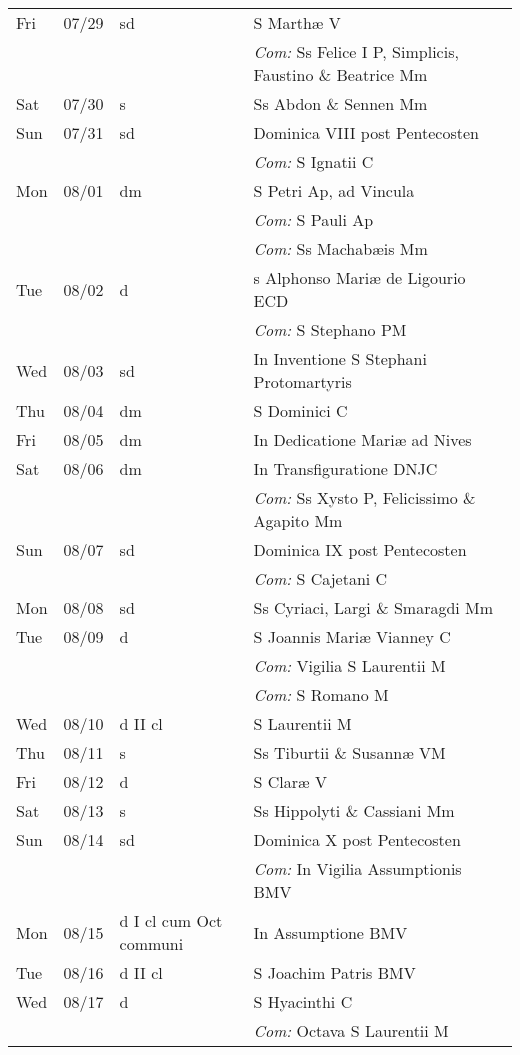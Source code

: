 \documentclass[10pt]{article}
\begin{document}
\begin{longtable}{ l l l l }
Fri & 07/29 & sd & S Marthæ V\\
 & & & \textit{Com:} Ss Felice I P, Simplicis, Faustino \& Beatrice Mm\\
Sat & 07/30 & s & Ss Abdon \& Sennen Mm\\
Sun & 07/31 & sd & Dominica VIII post Pentecosten\\
 & & & \textit{Com:} S Ignatii C\\
Mon & 08/01 & dm & S Petri Ap, ad Vincula\\
 & & & \textit{Com:} S Pauli Ap\\
 & & & \textit{Com:} Ss Machabæis Mm\\
Tue & 08/02 & d & s Alphonso Mariæ de Ligourio ECD\\
 & & & \textit{Com:} S Stephano PM\\
Wed & 08/03 & sd & In Inventione S Stephani Protomartyris\\
Thu & 08/04 & dm & S Dominici C\\
Fri & 08/05 & dm & In Dedicatione Mariæ ad Nives\\
Sat & 08/06 & dm & In Transfiguratione DNJC\\
 & & & \textit{Com:} Ss Xysto P, Felicissimo \& Agapito Mm\\
Sun & 08/07 & sd & Dominica IX post Pentecosten\\
 & & & \textit{Com:} S Cajetani C\\
Mon & 08/08 & sd & Ss Cyriaci, Largi \& Smaragdi Mm\\
Tue & 08/09 & d & S Joannis Mariæ Vianney C\\
 & & & \textit{Com:} Vigilia S Laurentii M\\
 & & & \textit{Com:} S Romano M\\
Wed & 08/10 & d II cl & S Laurentii M\\
Thu & 08/11 & s & Ss Tiburtii \& Susannæ VM\\
Fri & 08/12 & d & S Claræ V\\
Sat & 08/13 & s & Ss Hippolyti \& Cassiani Mm\\
Sun & 08/14 & sd & Dominica X post Pentecosten\\
 & & & \textit{Com:} In Vigilia Assumptionis BMV\\
Mon & 08/15 & d I cl cum Oct communi & In Assumptione BMV\\
Tue & 08/16 & d II cl & S Joachim Patris BMV\\
Wed & 08/17 & d & S Hyacinthi C\\
 & & & \textit{Com:} Octava S Laurentii M\\

\end{longtable}
\end{document}
